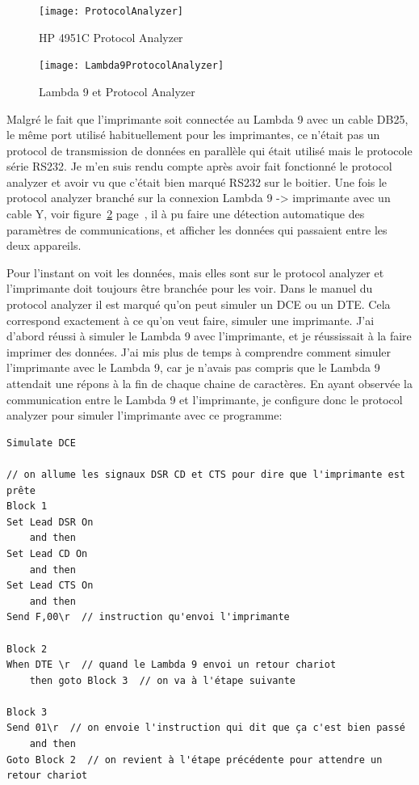 \documentclass[a4paper, 12pt]{article}
\begin{document}
\begin{figure}[h]
	\centering
	\texttt{[image: ProtocolAnalyzer]}
	\caption{HP 4951C Protocol Analyzer}
	\label{fig:protocolAnalyzer}
\end{figure}

\begin{figure}[h]
	\centering
	\texttt{[image: Lambda9ProtocolAnalyzer]}
	\caption{Lambda 9 et Protocol Analyzer}
	\label{fig:lambda9HP}
\end{figure}


Malgré le fait que l'imprimante soit connectée au Lambda 9 avec un cable DB25, le même port utilisé habituellement pour les imprimantes, ce n'était pas un protocol de transmission de données en parallèle qui était utilisé mais le protocole série RS232.
Je m'en suis rendu compte après avoir fait fonctionné le protocol analyzer et avoir vu que c'était bien marqué RS232 sur le boitier.  
Une fois le protocol analyzer branché sur la connexion Lambda 9 -> imprimante avec un cable Y, voir figure~\ref{fig:lambda9HP} page~\pageref{fig:lambda9HP}, il à pu faire une détection automatique des paramètres de communications, et afficher les données qui passaient entre les deux appareils.

Pour l'instant on voit les données, mais elles sont sur le protocol analyzer et l'imprimante doit toujours être branchée pour les voir.
Dans le manuel du protocol analyzer il est marqué qu'on peut simuler un DCE ou un DTE.
Cela correspond exactement à ce qu'on veut faire, simuler une imprimante.
J'ai d'abord réussi à simuler le Lambda 9 avec l'imprimante, et je réussissait à la faire imprimer des données.  
J'ai mis plus de temps à comprendre comment simuler l'imprimante avec le Lambda 9, car je n'avais pas compris que le Lambda 9 attendait une répons à la fin de chaque chaine de caractères.
En ayant observée la communication entre le Lambda 9 et l'imprimante, je configure donc le protocol analyzer pour simuler l'imprimante avec ce programme:

\begin{lstlisting}  
Simulate DCE  

// on allume les signaux DSR CD et CTS pour dire que l'imprimante est prête
Block 1  
Set Lead DSR On  
	and then  
Set Lead CD On  
	and then  
Set Lead CTS On  
	and then  
Send F,00\r  // instruction qu'envoi l'imprimante 
  
Block 2  
When DTE \r  // quand le Lambda 9 envoi un retour chariot
	then goto Block 3  // on va à l'étape suivante
  
Block 3  
Send 01\r  // on envoie l'instruction qui dit que ça c'est bien passé
	and then  
Goto Block 2  // on revient à l'étape précédente pour attendre un retour chariot
\end{lstlisting}  
\end{document}
